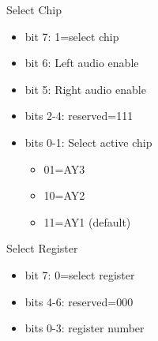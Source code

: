 Select Chip
\begin{itemize}
\item[] bit 7: 1=select chip
\item[] bit 6: Left audio enable
\item[] bit 5: Right audio enable
\item[] bits 2-4: reserved=111
\item[] bits 0-1: Select active chip
  \begin{itemize}
  \item[] 01=AY3
  \item[] 10=AY2
  \item[] 11=AY1 (default)
  \end{itemize}
\end{itemize}
 Select Register
\begin{itemize}
\item[] bit 7: 0=select register
\item[] bits 4-6: reserved=000
\item[] bits 0-3: register number
\end{itemize}
